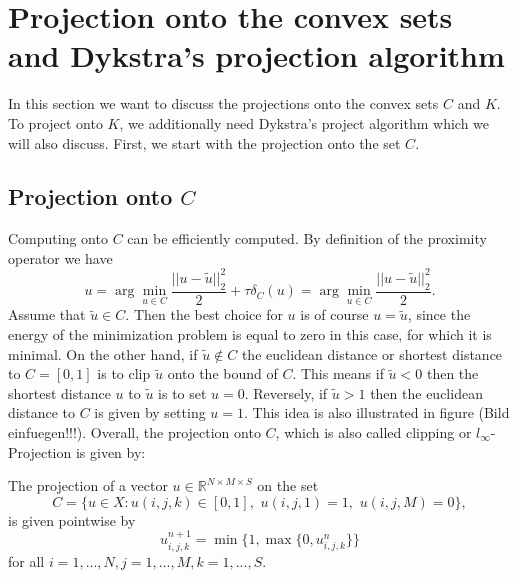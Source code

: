 \section{Projection onto the convex sets and Dykstra's projection algorithm}

    In this section we want to discuss the projections onto the convex sets $C$ and $K$. To project onto $K$, we additionally need Dykstra's project algorithm which we will also discuss. First, we start with the projection onto the set $C$.

    \subsection{Projection onto $C$}

    Computing onto $C$ can be efficiently computed. By definition of the proximity operator we have
        $$
            u = \arg\min_{u \in C} \frac{||u-\tilde{u}||_{2}^{2}}{2} + \tau \delta_{C}(u) = \arg\min_{u \in C} \frac{||u - \tilde{u}||_{2}^{2}}{2}.
        $$
    Assume that $\tilde{u} \in C$. Then the best choice for $u$ is of course $u = \tilde{u}$, since the energy of the minimization problem is equal to zero in this case, for which it is minimal. On the other hand, if $\tilde{u} \notin C$ the euclidean distance or shortest distance to $C = [0, 1]$ is to clip $\tilde{u}$ onto the bound of $C$. This means if $\tilde{u} < 0$ then the shortest distance $u$ to $\tilde{u}$ is to set $u = 0$. Reversely, if $\tilde{u} > 1$ then the euclidean distance to $C$ is given by setting $u = 1$. This idea is also illustrated in figure (Bild einfuegen!!!). Overall, the projection onto $C$, which is also called clipping or $l_{\infty}$-Projection is given by:

    \begin{algorithm}[Clipping]
        The projection of a vector $u \in \mathbb{R}^{N \times M \times S}$ on the set
            \begin{equation}
                C = \{ u \in X: u(i,j,k) \in [0,1], \,\, u(i, j, 1) = 1, \,\, u(i, j, M) = 0 \}, \label{eq:limits}
            \end{equation}
        is given pointwise by
            \begin{equation}
                u^{n+1}_{i,j,k} = \min\{1, \max \{ 0, u^{n}_{i, j, k} \} \}
            \end{equation}
        for all $i = 1, ..., N, j = 1, ..., M, k = 1, ..., S$.
    \end{algorithm}

